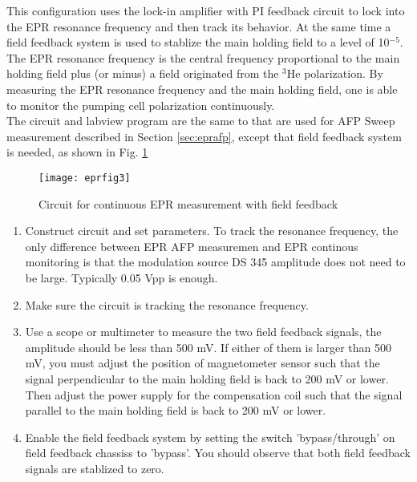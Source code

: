 {This configuration uses the lock-in amplifier with PI feedback 
circuit to lock into the EPR resonance frequency and then track its
behavior. At the same time a field feedback system is used to stablize the
main holding field to a level of 10$^{-5}$.  The EPR resonance frequency is the central
frequency proportional to the main holding field plus (or minus) a field originated
from the $^3$He polarization.  By measuring the EPR resonance frequency and
the main holding field, one is able to monitor the pumping cell polarization continuously.\\


The circuit and labview program are the same to that are used for AFP Sweep 
measurement described in Section \ref{sec:eprafp}, except that field feedback system 
is needed, as shown in Fig. \ref{fig3:epr}

\begin{figure}
\begin{center}
\centerline{ \texttt{[image: eprfig3]}}
\caption{Circuit for continuous EPR measurement with field feedback}
\end{center}
\label{fig3:epr}
\end{figure}



\begin{enumerate}
\item Construct circuit and set parameters.  To track the resonance frequency,
the only difference between EPR AFP measuremen and EPR continous monitoring is 
that the modulation source DS 345 amplitude does not need to be large.  Typically 
0.05 Vpp is enough.

\item Make sure the circuit is tracking the resonance frequency.

\item Use a scope or multimeter to measure the two field feedback signals, the 
amplitude should be less than 500 mV.  If either of them is larger than 500 mV, 
you must adjust the position of magnetometer sensor such that the signal perpendicular
to the main holding field is back to 200 mV or lower.  Then adjust the
power supply for the compensation coil such that the signal parallel to
the main holding field is back to 200 mV or lower.
 
\item Enable the field feedback system by setting the switch 'bypass/through' 
on field feedback chassiss to 'bypass'.  You should observe that both field 
feedback signals are stablized to zero.


\end{enumerate}}
